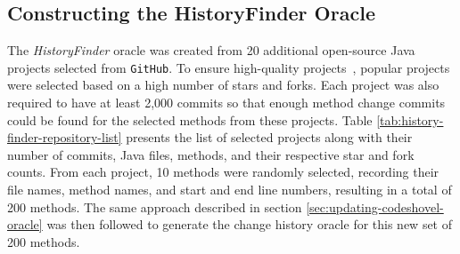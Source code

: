 \subsection{Constructing the HistoryFinder Oracle}
\label{sec:history-finder-oracle}
The \textit{HistoryFinder} oracle was created from 20 additional open-source Java projects selected from \texttt{GitHub}. To ensure high-quality projects~\cite{kalliamvakou_promises_2014}, popular projects were selected based on a high number of stars and forks. Each project was also required to have at least 2,000 commits so that enough method change commits could be found for the selected methods from these projects.
Table \ref{tab:history-finder-repository-list} presents the list of selected projects along with their number of commits, Java files, methods, and their respective star and fork counts. From each project, 10 methods were randomly selected, recording their file names, method names, and start and end line numbers, resulting in a total of 200 methods. The same approach described in section \ref{sec:updating-codeshovel-oracle} was then followed to generate the change history oracle for this new set of 200 methods.

